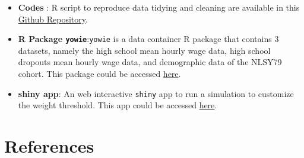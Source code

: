\documentclass[12pt]{article}
\begin{document}
\begin{itemize}
\item
  \textbf{Codes} : R script to reproduce data tidying and cleaning are available in this \href{https://github.com/numbats/yowie/blob/master/data-raw/data_preprocessing.R}{Github Repository}.
\item
  \textbf{R Package \texttt{yowie}}:\texttt{yowie} is a data container R package that contains 3 datasets, namely the high school mean hourly wage data, high school dropouts mean hourly wage data, and demographic data of the NLSY79 cohort. This package could be accessed \href{https://github.com/numbats/yowie}{here}.
\item
  \textbf{shiny app}: An web interactive \texttt{shiny} app to run a simulation to customize the weight threshold. This app could be accessed \href{https://github.com/numbats/wages-refresh/tree/main/app}{here}.
\end{itemize}

\hypertarget{references}{%
\section*{References}\label{references}}
\end{document}
